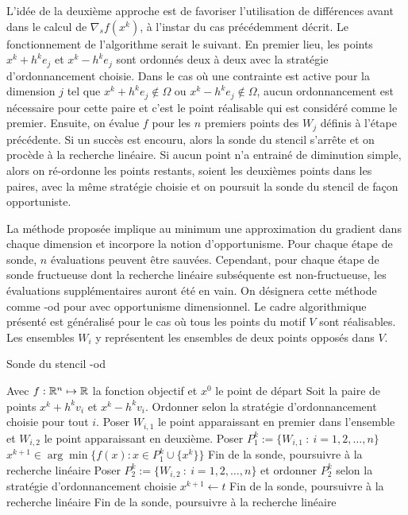 L'idée de la deuxième approche est de favoriser l'utilisation de différences avant dans le calcul de $\nabla_{s}f(x^k)$, à l'instar du cas précédemment décrit. Le fonctionnement de l'algorithme serait le suivant. En premier lieu, les points $x^k+h^ke_j$ et $x^k-h^ke_j$ sont ordonnés deux à deux avec la stratégie d'ordonnancement choisie. Dans le cas où une contrainte est active pour la dimension $j$ tel que $x^k+h^ke_j \notin \Omega$ ou $x^k-h^ke_j \notin \Omega$, aucun ordonnancement est nécessaire pour cette paire et c'est le point réalisable qui est considéré comme le premier. Ensuite, on évalue $f$ pour les $n$ premiers points des $W_j$ définis à l'étape précédente. Si un succès est encouru, alors la sonde du stencil s'arrête et on procède à la recherche linéaire. Si aucun point n'a entrainé de diminution simple, alors on ré-ordonne les points restants, soient les deuxièmes points dans les paires, avec la même stratégie choisie et on poursuit la sonde du stencil de façon opportuniste.  
  
La méthode proposée implique au minimum une approximation du gradient dans chaque dimension et incorpore la notion d'opportunisme. Pour chaque étape de sonde, $n$ évaluations peuvent être sauvées. Cependant, pour chaque étape de sonde fructueuse dont la recherche linéaire subséquente est non-fructueuse, les évaluations supplémentaires auront été en vain. On désignera cette méthode comme \textsf{\imfil-od} pour \imfil avec opportunisme dimensionnel. Le cadre algorithmique présenté est généralisé pour le cas où tous les points du motif $V$ sont réalisables. Les ensembles $W_i$ y représentent les ensembles de deux points opposés dans $V$.
\begin{algorithm}[H]
	\caption{\textsf{Sonde du stencil \imfil-od}}
	\label{alg:imfil-od}
	\begin{algorithmic}
		\STATE Avec $f:\mathbb{R}^n \mapsto \mathbb{R}$ la fonction objectif et $x^0$ le point de départ
		\STATE 
			Soit la paire de points $x^k+h^k v_i$ et $x^k-h^k v_i$. Ordonner selon la stratégie d'ordonnancement choisie pour tout $i$. Poser $W_{i,1}$ le point apparaissant en premier dans l'ensemble et $W_{i,2}$ le point apparaissant en deuxième.	 
		\STATE Poser $P^k_1 := \{W_{i,1}~:~i=1,2,\dots,n\}$
		\STATE $x^{k+1} \in \arg\min\{f(x) : x \in P^k_1 \cup \{x^k\}\}$
		\STATE Fin de la sonde, poursuivre à la recherche linéaire
		\ENDIF
		\STATE Poser $P^k_2 := \{W_{i,2}~:~i=1,2,\dots,n\}$ et ordonner $P^k_2$ selon la stratégie d'ordonnancement choisie
		\STATE $x^{k+1} \leftarrow t$
		\STATE Fin de la sonde, poursuivre à la recherche linéaire
		\ENDIF
		\ENDFOR
		\STATE Fin de la sonde, poursuivre à la recherche linéaire
	\end{algorithmic}
\end{algorithm}  